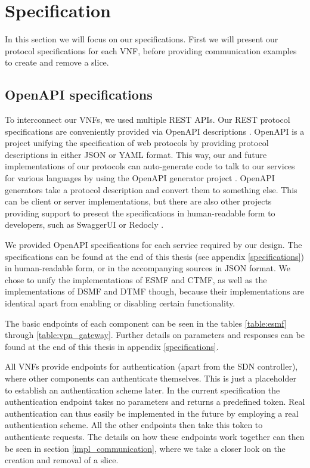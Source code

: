 \section{Specification}
\label{impl_specification}
In this section we will focus on our specifications. First we will present our protocol specifications for each VNF, before providing communication examples to create and remove a slice.

\subsection{OpenAPI specifications}
To interconnect our VNFs, we used multiple REST APIs. Our REST protocol specifications are conveniently provided via OpenAPI descriptions \cite{openapi}. OpenAPI is a project unifying the specification of web protocols by providing protocol descriptions in either JSON or YAML format. This way, our and future implementations of our protocols can auto-generate code to talk to our services for various languages by using the OpenAPI generator project \cite{openapi-generator}. OpenAPI generators take a protocol description and convert them to something else. This can be client or server implementations, but there are also other projects providing support to present the specifications in human-readable form to developers, such as SwaggerUI \cite{swaggerui} or Redocly \cite{redocly}.

We provided OpenAPI specifications for each service required by our design. The specifications can be found at the end of this thesis (see appendix \ref{specifications}) in human-readable form, or in the accompanying sources in JSON format. We chose to unify the implementations of ESMF and CTMF, as well as the implementations of DSMF and DTMF though, because their implementations are identical apart from enabling or disabling certain functionality.

The basic endpoints of each component can be seen in the tables \ref{table:esmf} through \ref{table:vpn_gateway}. Further details on parameters and responses can be found at the end of this thesis in appendix \ref{specifications}.

All VNFs provide endpoints for authentication (apart from the SDN controller), where other components can authenticate themselves. This is just a placeholder to establish an authentication scheme later. In the current specification the authentication endpoint takes no parameters and returns a predefined token. Real authentication can thus easily be implemented in the future by employing a real authentication scheme. All the other endpoints then take this token to authenticate requests. The details on how these endpoints work together can then be seen in section \ref{impl_communication}, where we take a closer look on the creation and removal of a slice.

